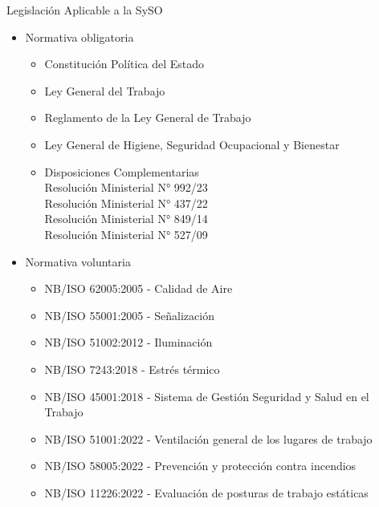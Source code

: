 \documentclass[spanish, aspectratio=169]{beamer}
\begin{document}
\begin{frame}[allowframebreaks]{Legislación Aplicable a la SySO}
  \begin{itemize}
      \item Normativa obligatoria
      \begin{itemize}
          \item Constitución Política del Estado
          \item Ley General del Trabajo
          \item Reglamento de la Ley General de Trabajo
          \item Ley General de Higiene, Seguridad Ocupacional y Bienestar
          \item Disposiciones Complementarias\\ \quad Resolución Ministerial N° 992/23\\ \quad Resolución Ministerial N° 437/22\\ \quad Resolución Ministerial N° 849/14\\ \quad Resolución Ministerial N° 527/09
      \end{itemize}
      \framebreak
      \item Normativa voluntaria
      \begin{itemize}
          \item NB/ISO 62005:2005 - Calidad de Aire
          \item NB/ISO 55001:2005 - Señalización
          \item NB/ISO 51002:2012 - Iluminación
          \item NB/ISO 7243:2018 - Estrés térmico
          \item NB/ISO 45001:2018 - Sistema de Gestión Seguridad y Salud en el Trabajo
          \item NB/ISO 51001:2022 - Ventilación general de los lugares de trabajo
          \item NB/ISO 58005:2022 - Prevención y protección contra incendios
          \item NB/ISO 11226:2022 - Evaluación de posturas de trabajo estáticas
      \end{itemize}
  \end{itemize}
\end{frame}
\end{document}
